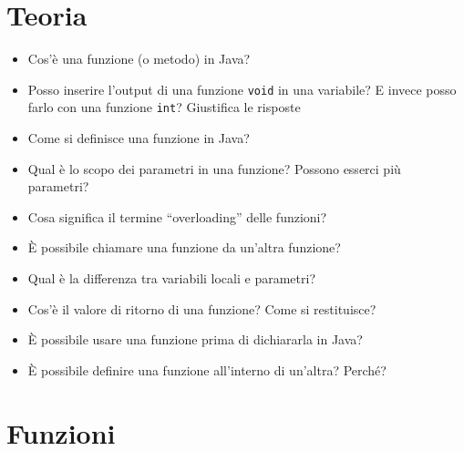 \documentclass{article}
\begin{document}
\section{Teoria}

\begin{itemize}
    \item Cos'è una funzione (o metodo) in Java?
    \item Posso inserire l'output di una funzione \texttt{void} in una variabile? 
    E invece posso farlo con una funzione \texttt{int}? Giustifica le risposte 
    \item Come si definisce una funzione in Java?
    \item Qual è lo scopo dei parametri in una funzione? Possono esserci più parametri?
    \item Cosa significa il termine ``overloading'' delle funzioni?
    \item È possibile chiamare una funzione da un'altra funzione?
    \item Qual è la differenza tra variabili locali e parametri?
    \item Cos'è il valore di ritorno di una funzione? Come si restituisce?
    \item È possibile usare una funzione prima di dichiararla in Java?
    \item È possibile definire una funzione all'interno di un'altra? Perché?
\end{itemize}

\section{Funzioni}
\end{document}
